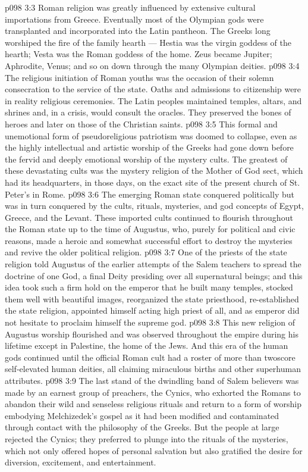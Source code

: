 \vs p098 3:3 Roman religion was greatly influenced by extensive cultural importations from Greece. Eventually most of the Olympian gods were transplanted and incorporated into the Latin pantheon. The Greeks long worshiped the fire of the family hearth --- Hestia was the virgin goddess of the hearth; Vesta was the Roman goddess of the home. Zeus became Jupiter; Aphrodite, Venus; and so on down through the many Olympian deities.
\vs p098 3:4 The religious initiation of Roman youths was the occasion of their solemn consecration to the service of the state. Oaths and admissions to citizenship were in reality religious ceremonies. The Latin peoples maintained temples, altars, and shrines and, in a crisis, would consult the oracles. They preserved the bones of heroes and later on those of the Christian saints.
\vs p098 3:5 This formal and unemotional form of pseudoreligious patriotism was doomed to collapse, even as the highly intellectual and artistic worship of the Greeks had gone down before the fervid and deeply emotional worship of the mystery cults. The greatest of these devastating cults was the mystery religion of the Mother of God sect, which had its headquarters, in those days, on the exact site of the present church of St. Peter’s in Rome.
\vs p098 3:6 \pc The emerging Roman state conquered politically but was in turn conquered by the cults, rituals, mysteries, and god concepts of Egypt, Greece, and the Levant. These imported cults continued to flourish throughout the Roman state up to the time of Augustus, who, purely for political and civic reasons, made a heroic and somewhat successful effort to destroy the mysteries and revive the older political religion.
\vs p098 3:7 One of the priests of the state religion told Augustus of the earlier attempts of the Salem teachers to spread the doctrine of one God, a final Deity presiding over all supernatural beings; and this idea took such a firm hold on the emperor that he built many temples, stocked them well with beautiful images, reorganized the state priesthood, re\hyp{}established the state religion, appointed himself acting high priest of all, and as emperor did not hesitate to proclaim himself the supreme god.
\vs p098 3:8 This new religion of Augustus worship flourished and was observed throughout the empire during his lifetime except in Palestine, the home of the Jews. And this era of the human gods continued until the official Roman cult had a roster of more than twoscore self\hyp{}elevated human deities, all claiming miraculous births and other superhuman attributes.
\vs p098 3:9 \pc The last stand of the dwindling band of Salem believers was made by an earnest group of preachers, the Cynics, who exhorted the Romans to abandon their wild and senseless religious rituals and return to a form of worship embodying Melchizedek’s gospel as it had been modified and contaminated through contact with the philosophy of the Greeks. But the people at large rejected the Cynics; they preferred to plunge into the rituals of the mysteries, which not only offered hopes of personal salvation but also gratified the desire for diversion, excitement, and entertainment.
